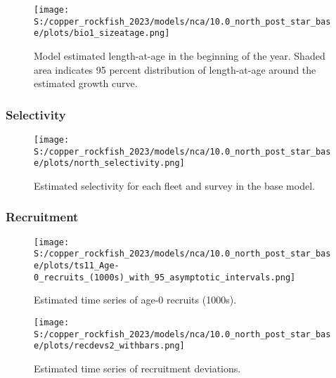 \documentclass[11pt,
  letterpaper,
]{article}
\begin{document}
\begin{figure}
{\centering
\texttt{[image: S:/copper\_rockfish\_2023/models/nca/10.0\_north\_post\_star\_base/plots/bio1\_sizeatage.png]}
}
\caption{Model estimated length-at-age in the beginning of the year. Shaded area indicates 95 percent distribution of length-at-age around the estimated growth curve.\label{fig:mod-est-len-age}}
\end{figure}

\pagebreak

\subsubsection{Selectivity}\label{selectivity}

\begin{figure}
{\centering
\texttt{[image: S:/copper\_rockfish\_2023/models/nca/10.0\_north\_post\_star\_base/plots/north\_selectivity.png]}
}
\caption{Estimated selectivity for each fleet and survey in the base model.\label{fig:est-selex}}
\end{figure}

\pagebreak

\subsubsection{Recruitment}\label{recruitment}

\begin{figure}
{\centering
\texttt{[image: S:/copper\_rockfish\_2023/models/nca/10.0\_north\_post\_star\_base/plots/ts11\_Age-0\_recruits\_(1000s)\_with\_95\_asymptotic\_intervals.png]}
}
\caption{Estimated time series of age-0 recruits (1000s).\label{fig:recruits}}
\end{figure}

\pagebreak

\begin{figure}
{\centering
\texttt{[image: S:/copper\_rockfish\_2023/models/nca/10.0\_north\_post\_star\_base/plots/recdevs2\_withbars.png]}
}
\caption{Estimated time series of recruitment deviations.\label{fig:rec-devs}}
\end{figure}
\end{document}

